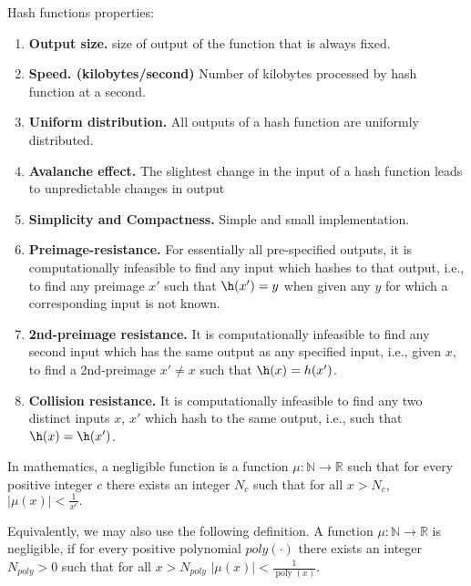 Hash functions properties:
\begin{enumerate}[noitemsep]
    \item \textbf{Output size.}
        size of output of the function that is always fixed.
    \item \textbf{Speed. (kilobytes/second)}
        Number of kilobytes processed by hash function at a second.
    \item \textbf{Uniform distribution.}
        All outputs of a hash function are uniformly distributed.
    \item \textbf{Avalanche effect.}
        The slightest change in the input of a hash function leads
        to unpredictable changes in output
    \item \textbf{Simplicity and Compactness.}
        Simple and small implementation.
    \item \textbf{Preimage-resistance.}
        For essentially all pre-specified outputs,
        it is computationally infeasible to find any input which hashes to that output,
        i.e., to find any preimage $x'$ such that $\h(x') = y$ when given any $y$ for which
        a corresponding input is not known.
    \item \textbf{2nd-preimage resistance.}
        It is computationally infeasible to find any second
        input which has the same output as any specified input, i.e., given $x$, to find
        a 2nd-preimage $x' \neq x$ such that $\h(x) = h(x')$.
    \item \textbf{Collision resistance.}
        It is computationally infeasible to find any two distinct
        inputs $x$, $x'$ which hash to the same output, i.e., such that $\h(x) = \h(x')$.
\end{enumerate}

\begin{definition}
    In mathematics, a negligible function is a function  $\mu: \mathbb{N} \rightarrow \mathbb{R}$
    such that for every positive integer $c$ there exists an integer $N_c$ such that for all $x > N_c$,
    $|\mu (x)| < \frac {1}{x^{c}}.$
    
    Equivalently, we may also use the following definition. A function 
    $\mu :\mathbb {N} \to \mathbb {R}$ is negligible, if for every positive
    polynomial $poly(\cdot)$ there exists an integer $N_{poly} > 0$ such that
    for all $x > N_{poly}$
    $|\mu (x)|<{\frac {1}{\operatorname {poly} (x)}}.$
\end{definition}

